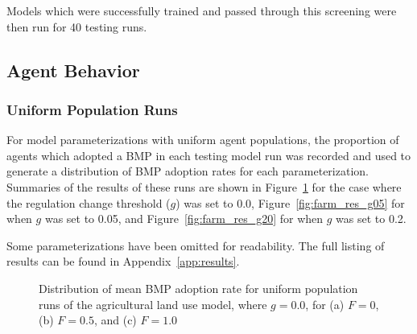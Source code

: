 Models which were successfully trained and passed through this screening
were then run for 40 testing runs.

\subsection{Agent Behavior}
\label{subsec:farm_results_agents}

\subsubsection{Uniform Population Runs}

For model parameterizations with uniform agent populations,
the proportion of agents which adopted a BMP in each testing model run
was recorded and used to generate a distribution of BMP adoption rates
for each parameterization.
Summaries of the results of these runs are shown
in Figure~\ref{fig:farm_res_g00} for the case where the regulation change
threshold ($g$) was set to 0.0,
Figure~\ref{fig:farm_res_g05} for when $g$ was set to 0.05, and 
Figure~\ref{fig:farm_res_g20} for when $g$ was set to 0.2.

Some parameterizations have been omitted for readability.
The full listing of results can be found in
Appendix~\ref{app:results}.

\begin{figure}
    \hfill
    \hfill
    \caption{Distribution of mean BMP adoption rate for uniform population
        runs of the agricultural land use model, where $g=0.0$,
        for (a) $F=0$, (b) $F=0.5$, and (c) $F=1.0$}
    \label{fig:farm_res_g00}
\end{figure}


